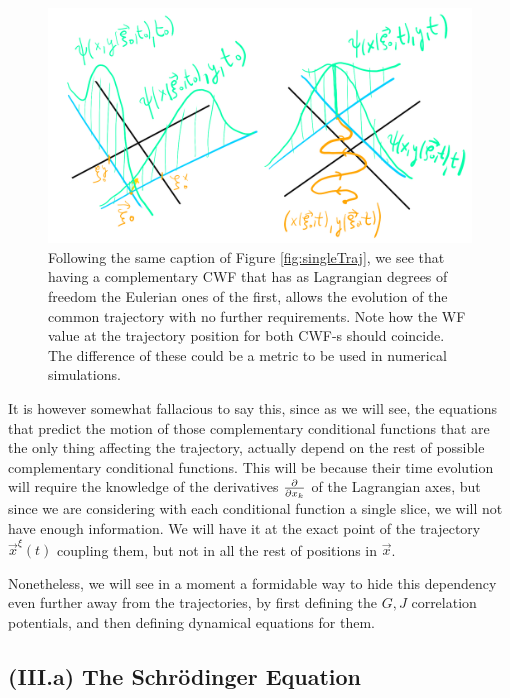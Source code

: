 \documentclass[11pt, a4paper]{article} %
\begin{document}
\begin{figure}[h!]
  \centering
    \includegraphics[width=0.65\linewidth]{bohmian_pair.png}
  \caption{Following the same caption of Figure \ref{fig:singleTraj}, we see that having a complementary CWF that has as Lagrangian degrees of freedom the Eulerian ones of the first, allows the evolution of the common trajectory with no further requirements. Note how the WF value at the trajectory position for both CWF-s should coincide. The difference of these could be a metric to be used in numerical simulations.  }
  \label{fig:pair_bohm}
\end{figure}

It is however somewhat fallacious to say this, since as we will see, the equations that predict the motion of those complementary conditional functions that are the only thing affecting the trajectory, actually depend on the rest of possible complementary conditional functions. This will be because their time evolution will require the knowledge of the derivatives $\pdv{}{x_k}$ of the Lagrangian axes, but since we are considering with each conditional function a single slice, we will not have enough information. We will have it at the exact point of the trajectory $\vec{x}^\xi(t)$ coupling them, but not in all the rest of positions in $\vec{x}$.

Nonetheless, we will see in a moment a formidable way to hide this dependency even further away from the trajectories, by first defining the $G,J$ correlation potentials, and then defining dynamical equations for them.

\newpage
\subsection*{(III.a) The Schrödinger Equation}
\end{document}
